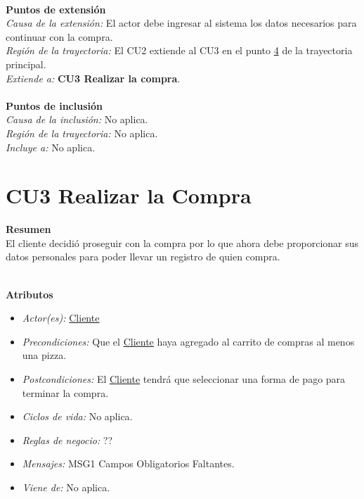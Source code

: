 \noindent \textbf{\\Puntos de extensión}\\

\noindent \textit{Causa de la extensión:} El actor debe ingresar al sistema los datos necesarios para continuar con la compra.\\
\textit{Región de la trayectoria:} El CU2 extiende al CU3 en el punto \hyperlink{CU2:TP:P4}{4} de la trayectoria principal. \\
\textit{Extiende a:} \textbf{CU3 Realizar la compra}.\\


\noindent \textbf{\\Puntos de inclusión}\\

\noindent \textit{Causa de la inclusión:} No aplica.\\
\textit{Región de la trayectoria:} No aplica.\\
\textit{Incluye a:} No aplica.\\

\hypertarget{CU3}{}
\section{CU3 Realizar la Compra}

\noindent \textbf{Resumen}\\

El cliente decidió proseguir con la compra por lo que ahora debe proporcionar sus datos personales para poder llevar un registro de quien compra.

\noindent \textbf{\\Atributos}

\begin{itemize}
	
	\item \textit{Actor(es):} \hyperlink{A:Cliente}{Cliente}
	\item \textit{Precondiciones:} Que el \hyperlink{A:Cliente}{Cliente} haya agregado al carrito de compras al menos una pizza.
	\item \textit{Postcondiciones:} El \hyperlink{A:Cliente}{Cliente} tendrá que seleccionar una forma de pago para terminar la compra.
	\item \textit{Ciclos de vida:} No aplica.
	\item \textit{Reglas de negocio:} ??
	\item \textit{Mensajes:} MSG1 Campos Obligatorios Faltantes.
	\item \textit{Viene de:} No aplica.
	
\end{itemize} 

